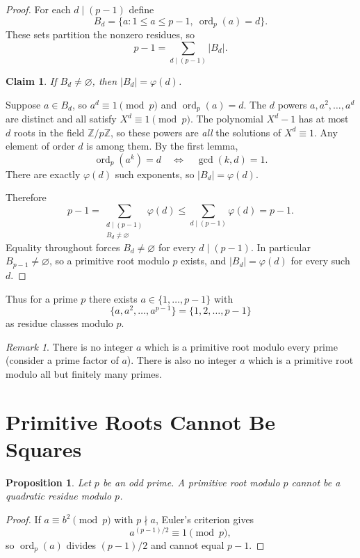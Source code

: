 \documentclass[11pt]{article}
\newtheorem{proposition}[theorem]{Proposition}
\newtheorem{claim}[theorem]{Claim}
\theoremstyle{remark}
\newtheorem*{remark}{Remark}
\DeclareMathOperator{\gcdop}{gcd}
\DeclareMathOperator{\ord}{ord}
\newcommand{\Z}{\mathbb Z}
\newcommand{\phiE}{\varphi}
\begin{document}
\begin{proof}
For each $d\mid(p-1)$ define
\[
    B_d=\{a:1\le a\le p-1,\ \ord_p(a)=d\}.
\]
These sets partition the nonzero residues, so
\[
    p-1=\sum_{d\mid(p-1)}|B_d|.
\]

\begin{claim}
If $B_d\neq\varnothing$, then $|B_d|=\phiE(d)$.
\end{claim}

Suppose $a\in B_d$, so $a^d\equiv 1\pmod p$ and $\ord_p(a)=d$. The $d$
powers $a,a^2,\ldots,a^d$ are distinct and all satisfy $X^d\equiv 1\pmod p$.
The polynomial $X^d-1$ has at most $d$ roots in the field $\Z/p\Z$, so these
powers are \emph{all} the solutions of $X^d\equiv 1$. Any element of order
$d$ is among them. By the first lemma,
\[
    \ord_p(a^k)=d
    \quad\Longleftrightarrow\quad
    \gcdop(k,d)=1.
\]
There are exactly $\phiE(d)$ such exponents, so $|B_d|=\phiE(d)$.

Therefore
\[
    p-1
    =
    \sum_{\substack{d\mid(p-1)\\ B_d\neq\varnothing}}\phiE(d)
    \le
    \sum_{d\mid(p-1)}\phiE(d)
    =p-1.
\]
Equality throughout forces $B_d\neq\varnothing$ for every $d\mid(p-1)$. In
particular $B_{p-1}\neq\varnothing$, so a primitive root modulo $p$ exists,
and $|B_d|=\phiE(d)$ for every such $d$.
\end{proof}

Thus for a prime $p$ there exists $a\in\{1,\ldots,p-1\}$ with
\[
    \{a,a^2,\ldots,a^{p-1}\}=\{1,2,\ldots,p-1\}
\]
as residue classes modulo $p$.

\begin{remark}
There is no integer $a$ which is a primitive root modulo every prime
(consider a prime factor of $a$). There is also no integer $a$ which is a
primitive root modulo all but finitely many primes.
\end{remark}

\section{Primitive Roots Cannot Be Squares}

\begin{proposition}
Let $p$ be an odd prime. A primitive root modulo $p$ cannot be a quadratic
residue modulo $p$.
\end{proposition}

\begin{proof}
If $a\equiv b^2\pmod p$ with $p\nmid a$, Euler's criterion gives
\[
    a^{(p-1)/2}\equiv 1\pmod p,
\]
so $\ord_p(a)$ divides $(p-1)/2$ and cannot equal $p-1$.
\end{proof}
\end{document}
